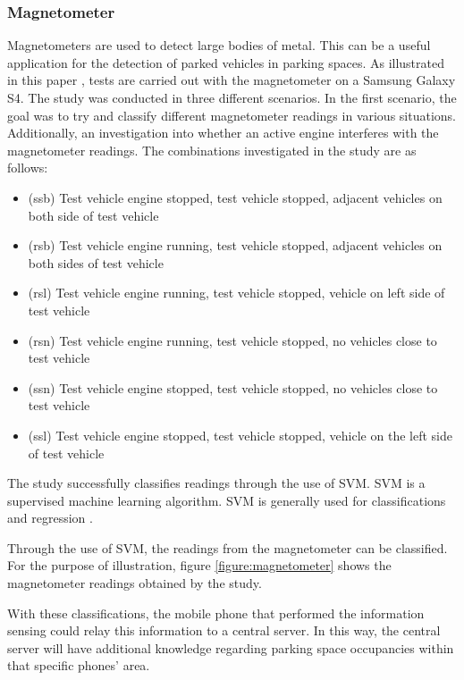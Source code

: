 \pagebreak

\subsubsection*{Magnetometer}
Magnetometers are used to detect large bodies of metal. This can be a useful application for the detection of parked vehicles in parking spaces. As illustrated in this paper \citep{Villanueva2016CrowdsensingMonitoring}, tests are carried out with the magnetometer on a Samsung Galaxy S4. The study was conducted in three different scenarios. In the first scenario, the goal was to try and classify different magnetometer readings in various situations. Additionally, an investigation into whether an active engine interferes with the magnetometer readings. The combinations investigated in the study are as follows:

\begin{itemize}
    \item (ssb) Test vehicle engine stopped, test vehicle stopped, adjacent vehicles on both side of test vehicle
    \item (rsb) Test vehicle engine running, test vehicle stopped, adjacent vehicles on both sides of test vehicle
    \item (rsl) Test vehicle engine running, test vehicle stopped, vehicle on left side of test vehicle
    \item (rsn) Test vehicle engine running, test vehicle stopped, no vehicles close to test vehicle
    \item (ssn) Test vehicle engine stopped, test vehicle stopped, no vehicles close to test vehicle
    \item (ssl) Test vehicle engine stopped, test vehicle stopped, vehicle on the left side of test vehicle
\end{itemize}

The study successfully classifies readings through the use of \ac{SVM}. \ac{SVM} is a supervised machine learning algorithm. \ac{SVM} is generally used for classifications and regression \citep{Suykens1999LeastClassifiers}. 

Through the use of \ac{SVM}, the readings from the magnetometer can be classified. For the purpose of illustration, figure \ref{figure:magnetometer} shows the magnetometer readings obtained by the study.

With these classifications, the mobile phone that performed the information sensing could relay this information to a central server. In this way, the central server will have additional knowledge regarding parking space occupancies within that specific phones' area.

